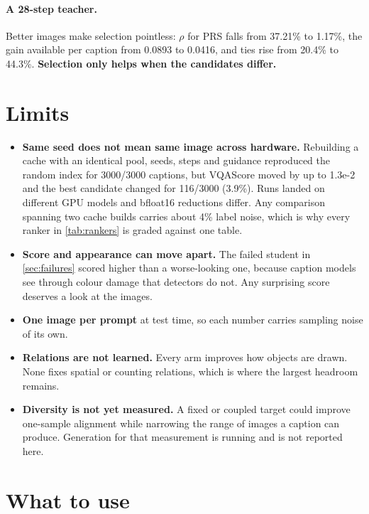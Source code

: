 \documentclass[11pt]{article}
\newcommand{\obs}[1]{\textcolor{obsblue}{#1}}
\begin{document}
\paragraph{A 28-step teacher.}
Better images make selection pointless: $\rho$ for PRS falls from \obs{37.21\%} to \obs{1.17\%}, the
gain available per caption from \obs{0.0893} to \obs{0.0416}, and ties rise from \obs{20.4\%} to
\obs{44.3\%}. \textbf{Selection only helps when the candidates differ.}


\section{Limits}
\label{sec:limits}

\begin{itemize}
  \item \textbf{Same seed does not mean same image across hardware.} Rebuilding a cache with an
    identical pool, seeds, steps and guidance reproduced the random index for \obs{3000/3000}
    captions, but VQAScore moved by up to \obs{1.3e-2} and the best candidate changed for
    \obs{116/3000} (\obs{3.9\%}). Runs landed on different GPU models and bfloat16 reductions differ.
    Any comparison spanning two cache builds carries about \obs{4\%} label noise, which is why every
    ranker in \cref{tab:rankers} is graded against one table.
  \item \textbf{Score and appearance can move apart.} The failed student in \cref{sec:failures}
    scored higher than a worse-looking one, because caption models see through colour damage that
    detectors do not. Any surprising score deserves a look at the images.
  \item \textbf{One image per prompt} at test time, so each number carries sampling noise of its own.
  \item \textbf{Relations are not learned.} Every arm improves how objects are drawn. None fixes
    spatial or counting relations, which is where the largest headroom remains.
  \item \textbf{Diversity is not yet measured.} A fixed or coupled target could improve one-sample
    alignment while narrowing the range of images a caption can produce. Generation for that
    measurement is running and is not reported here.
\end{itemize}


\section{What to use}
\end{document}
